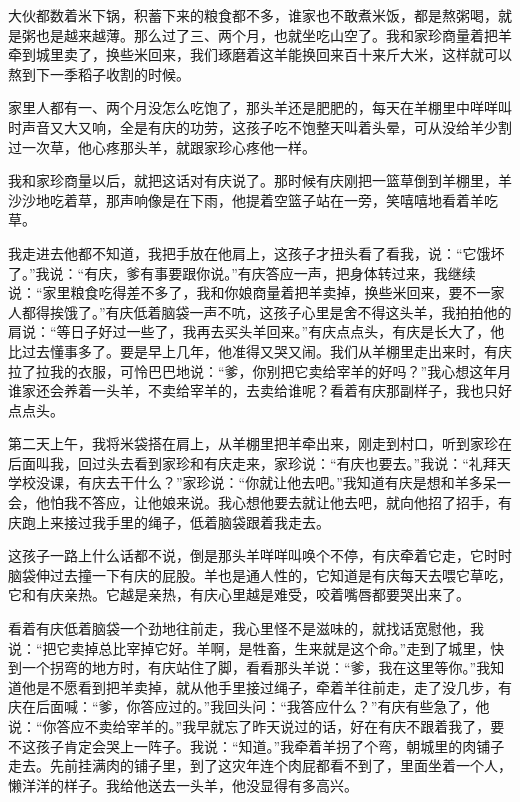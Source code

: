\documentclass[12pt,UTF8]{ctexbook}
\begin{document}
大伙都数着米下锅，积蓄下来的粮食都不多，谁家也不敢煮米饭，都是熬粥喝，就是粥也是越来越薄。那么过了三、两个月，也就坐吃山空了。我和家珍商量着把羊牵到城里卖了，换些米回来，我们琢磨着这羊能换回来百十来斤大米，这样就可以熬到下一季稻子收割的时候。

家里人都有一、两个月没怎么吃饱了，那头羊还是肥肥的，每天在羊棚里中咩咩叫时声音又大又响，全是有庆的功劳，这孩子吃不饱整天叫着头晕，可从没给羊少割过一次草，他心疼那头羊，就跟家珍心疼他一样。

我和家珍商量以后，就把这话对有庆说了。那时候有庆刚把一篮草倒到羊棚里，羊沙沙地吃着草，那声响像是在下雨，他提着空篮子站在一旁，笑嘻嘻地看着羊吃草。

我走进去他都不知道，我把手放在他肩上，这孩子才扭头看了看我，说：“它饿坏了。”我说：“有庆，爹有事要跟你说。”有庆答应一声，把身体转过来，我继续说：“家里粮食吃得差不多了，我和你娘商量着把羊卖掉，换些米回来，要不一家人都得挨饿了。”有庆低着脑袋一声不吭，这孩子心里是舍不得这头羊，我拍拍他的肩说：“等日子好过一些了，我再去买头羊回来。”有庆点点头，有庆是长大了，他比过去懂事多了。要是早上几年，他准得又哭又闹。我们从羊棚里走出来时，有庆拉了拉我的衣服，可怜巴巴地说：“爹，你别把它卖给宰羊的好吗？”我心想这年月谁家还会养着一头羊，不卖给宰羊的，去卖给谁呢？看着有庆那副样子，我也只好点点头。

第二天上午，我将米袋搭在肩上，从羊棚里把羊牵出来，刚走到村口，听到家珍在后面叫我，回过头去看到家珍和有庆走来，家珍说：“有庆也要去。”我说：“礼拜天学校没课，有庆去干什么？”家珍说：“你就让他去吧。”我知道有庆是想和羊多呆一会，他怕我不答应，让他娘来说。我心想他要去就让他去吧，就向他招了招手，有庆跑上来接过我手里的绳子，低着脑袋跟着我走去。

这孩子一路上什么话都不说，倒是那头羊咩咩叫唤个不停，有庆牵着它走，它时时脑袋伸过去撞一下有庆的屁股。羊也是通人性的，它知道是有庆每天去喂它草吃，它和有庆亲热。它越是亲热，有庆心里越是难受，咬着嘴唇都要哭出来了。

看着有庆低着脑袋一个劲地往前走，我心里怪不是滋味的，就找话宽慰他，我说：“把它卖掉总比宰掉它好。羊啊，是牲畜，生来就是这个命。”走到了城里，快到一个拐弯的地方时，有庆站住了脚，看看那头羊说：“爹，我在这里等你。”我知道他是不愿看到把羊卖掉，就从他手里接过绳子，牵着羊往前走，走了没几步，有庆在后面喊：“爹，你答应过的。”我回头问：“我答应什么？”有庆有些急了，他说：“你答应不卖给宰羊的。”我早就忘了昨天说过的话，好在有庆不跟着我了，要不这孩子肯定会哭上一阵子。我说：“知道。”我牵着羊拐了个弯，朝城里的肉铺子走去。先前挂满肉的铺子里，到了这灾年连个肉屁都看不到了，里面坐着一个人，懒洋洋的样子。我给他送去一头羊，他没显得有多高兴。
\end{document}
